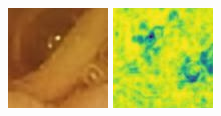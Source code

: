 \documentclass[conference]{IEEEtran}
\begin{document}
\begin{figure}[!t]
    \endminipage\hfill
        \centering
        \includegraphics[width=\linewidth]{Figures/520/520_SRGAN.jpg}
        
        \vfill
        \includegraphics[width=\linewidth]{Figures/520/520_SRGAN_ssim.jpg}
        

\end{figure}
\end{document}
